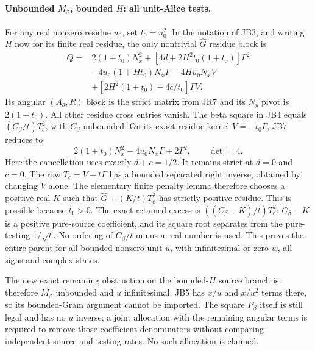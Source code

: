 \paragraph{Unbounded $M_\beta$, bounded $H$: all unit-Alice tests.}
For any real nonzero residue $u_0$, set $t_0=u_0^2$. In the notation
of JB3, and writing $H$ now for its finite real residue, the only
nontrivial $\widehat G$ residue block is
\begin{align*}
 Q={}&2(1+t_0)N_x^2+[4d+2H^2t_0(1+t_0)]\Gamma^2\\
 &-4u_0(1+Ht_0)N_x\Gamma-4Hu_0N_xV\\
 &+[2H^2(1+t_0)-4c/t_0]\Gamma V.
\tag{JB7}
\end{align*}
Its angular $(A_\theta,R)$ block is the strict matrix from JR7 and
its $N_y$ pivot is $2(1+t_0)$. All other residue cross entries vanish.
The beta square in JB4 equals $(C_\beta/t)T_c^2$, with
$C_\beta$ unbounded. On its exact residue kernel $V=-t_0\Gamma$,
JB7 reduces to
\[
 2(1+t_0)N_x^2-4u_0N_x\Gamma+2\Gamma^2,
 \qquad \det=4.
\tag{JB8}
\]
Here the cancellation uses exactly $d+c=1/2$. It remains strict at
$d=0$ and $c=0$. The row $T_c=V+t\Gamma$ has a bounded separated
right inverse, obtained by changing $V$ alone. The elementary finite
penalty lemma therefore chooses a positive real $K$ such that
$\widehat G+(K/t)T_c^2$ has strictly positive residue. This is possible
because $t_0>0$. The exact retained excess is
$((C_\beta-K)/t)T_c^2$: $C_\beta-K$ is a positive pure-source
coefficient, and its square root separates from the pure-testing
$1/\sqrt t$. No ordering of $C_\beta/t$ minus a real number is used.
This proves the entire
parent for all bounded nonzero-unit $u$, with infinitesimal or zero
$w$, all signs and complex states.

The new exact remaining obstruction on the bounded-$H$ source branch
is therefore $M_\beta$ unbounded and $u$ infinitesimal. JB5 has
$x/u$ and $x/u^2$ terms there, so its bounded-Gram argument cannot be
imported. The square $P_\beta$ itself is still legal and has no
$u$ inverse; a joint allocation with the remaining angular terms is
required to remove those coefficient denominators without comparing
independent source and testing rates. No such allocation is claimed.

